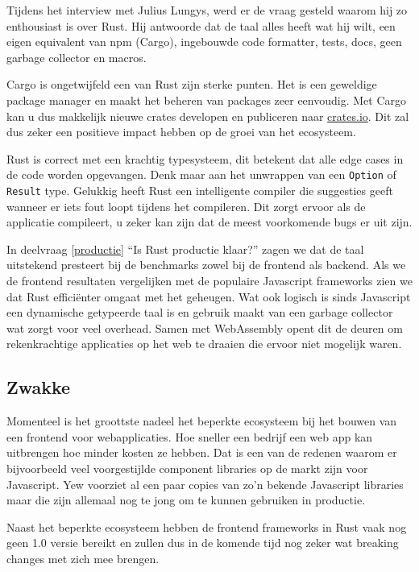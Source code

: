 Tijdens het interview met Julius Lungys, werd er de vraag gesteld waarom hij zo enthousiast is over
Rust. Hij antwoorde dat de taal alles heeft wat hij wilt, een eigen equivalent van npm (Cargo),
ingebouwde code formatter, tests, docs, geen garbage collector en macros.

Cargo is ongetwijfeld een van Rust zijn sterke punten. Het is een geweldige package manager en maakt
het beheren van packages zeer eenvoudig. Met Cargo kan u dus makkelijk nieuwe crates developen en
publiceren naar \url{crates.io}. Dit zal dus zeker een positieve impact hebben op de groei van het
ecosysteem.

Rust is correct met een krachtig typesysteem, dit betekent dat alle edge cases in de code worden
opgevangen. Denk maar aan het unwrappen van een \texttt{Option} of
\texttt{Result} type. Gelukkig heeft Rust een intelligente compiler die suggesties geeft
wanneer er iets fout loopt tijdens het compileren. Dit zorgt ervoor als de applicatie compileert, u
zeker kan zijn dat de meest voorkomende bugs er uit zijn.

In deelvraag \ref{productie} \enquote{Is Rust productie klaar?} zagen we dat de taal uitstekend
presteert bij de benchmarks zowel bij de frontend als backend. Als we de frontend resultaten
vergelijken met de populaire Javascript frameworks zien we dat Rust efficiënter omgaat met het
geheugen. Wat ook logisch is sinds Javascript een dynamische getypeerde taal is en gebruik maakt van
een garbage collector wat zorgt voor veel overhead. Samen met WebAssembly opent dit de deuren om
rekenkrachtige applicaties op het web te draaien die ervoor niet mogelijk waren.

\subsection{Zwakke}

Momenteel is het groottste nadeel het beperkte ecosysteem bij het bouwen van een frontend voor
webapplicaties. Hoe sneller een bedrijf een web app kan uitbrengen hoe minder kosten ze hebben. Dat
is een van de redenen waarom er bijvoorbeeld veel voorgestijlde component libraries op de markt zijn
voor Javascript. Yew voorziet al een paar copies van zo'n bekende Javascript libraries maar die zijn
allemaal nog te jong om te kunnen gebruiken in productie.

Naast het beperkte ecosysteem hebben de frontend frameworks in Rust vaak nog geen 1.0 versie bereikt
en zullen dus in de komende tijd nog zeker wat breaking changes met zich mee brengen.

